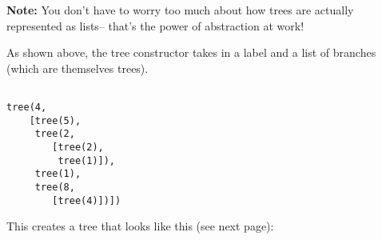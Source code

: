 \textbf{Note:} You don't have to worry too much about how trees are actually represented as lists-- that's the power of abstraction at work!

As shown above, the tree constructor takes in a label and a list of branches (which are themselves trees).

\begin{lstlisting}

tree(4,
    [tree(5),
     tree(2,
        [tree(2),
         tree(1)]),
     tree(1),
     tree(8,
        [tree(4)])])
\end{lstlisting}

This creates a tree that looks like this (see next page):

